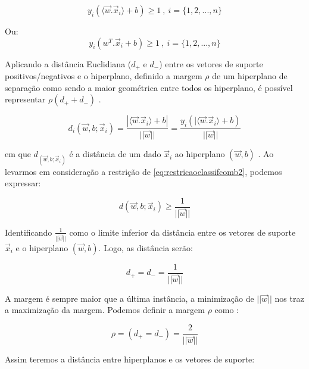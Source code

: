 \documentclass[
  openany]{book}
\begin{document}
\begin{equation}
y_i(\langle\vec{w}.\vec{x}_i\rangle+b)\geq  1 \ ,  \ i=\{1,2,...,n\}
\label{eq:restricaoclassifcom}
\end{equation}

Ou:
\begin{equation}
y_i(w^T.\vec{x}_i+b)\geq  1 \ ,  \ i=\{1,2,...,n\}
\label{eq:restricaoclassifcomb2}
\end{equation}

Aplicando a distância Euclidiana (\(d_+\) e \(d_-\)) entre os vetores de suporte positivos/negativos e o hiperplano, definido a margem \(\rho\) de um hiperplano de separação como sendo a maior geométrica entre todos os hiperplano, é possível representar \(\rho(d_+ + d_-)\) \citep{gonccalves2015maquina}.

\begin{equation}
d_i(\vec{w},b;\vec{x}_i)=\frac{|\langle\vec{w}.\vec{x}_i\rangle+b|}{||\vec{w}||}=\frac{y_i(|\langle\vec{w}.\vec{x}_i\rangle+b)}{||\vec{w}||}
\label{eq:distanciahip}
\end{equation}

em que \(d_(\vec{w},b;\vec{x}_i)\) é a distância de um dado \(\vec{x}_i\) ao hiperplano \((\vec{w},b)\) \citep{lima2002maquinas}. Ao levarmos em consideração a restrição de \eqref{eq:restricaoclassifcomb2}, podemos expressar:

\begin{equation}
d(\vec{w},b;\vec{x}_i)\geq \frac{1}{||\vec{w}||}
\label{eq:distcrestri}
\end{equation}

Identificando \(\frac{1}{||\vec{w}||}\) como o limite inferior da distância entre os vetores de suporte \(\vec{x}_i\) e o hiperplano \((\vec{w},b)\). Logo, as distância serão:

\begin{equation}
d_+=d_-=\frac{1}{||\vec{w}||}
\label{eq:distanciamarg}
\end{equation}

A margem é sempre maior que a última instância, a minimização de \(||\vec{w}||\) nos traz a maximização da margem. Podemos definir a margem \(\rho\) como \citep{gonccalves2015maquina}:

\begin{equation}
\rho=(d_+=d_-)=\frac{2}{||\vec{w}||}
\label{eq:margemsvm}
\end{equation}

Assim teremos a distância entre hiperplanos e os vetores de suporte:
\end{document}
